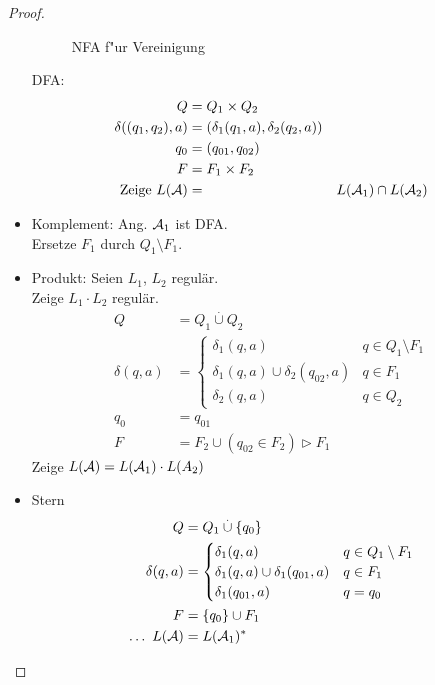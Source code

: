 \begin{proof}
\begin{itemize}
\begin{figure}[tp]
            \caption{\acs{NFA} f"ur Vereinigung}
            \label{fig:reg-closure-union}
        \end{figure}
		DFA:
		\begin{align*}
			Q &= Q_1\times Q_2\\
			\delta((q_1,q_2),a) &= (\delta_1(q_1,a),\delta_2(q_2,a))\\
			q_0 &= (q_{01},q_{02})\\
			F &= F_1\times F_2\\
			\text{Zeige }L(\mathcal{A}) &= &L(\mathcal{A}_1)\cap L(\mathcal{A}_2)
		\end{align*}
	\item Komplement: Ang. $\mathcal{A}_1$ ist \ac{DFA}.\\
		Ersetze $F_1$ durch $Q_1\setminus F_1$.
%
%
	\item Produkt: Seien $L_1$, $L_2$ regulär.\\
		Zeige $L_1\cdot L_2$ regulär.
		\begin{align*}
			Q &= Q_1 \overset.\cup Q_2\\
			\delta(q,a) &=
				\begin{cases}
					\delta_1(q,a) & q\in Q_1\setminus F_1\\
					\delta_1(q,a)\cup\delta_2(q_{02},a) & q\in F_1\\
					\delta_2(q,a) & q\in Q_2
				\end{cases}\\
		q_0& = q_{01}\\
		F &= F_2\cup(q_{02}\in F_2) \rhd F_1
		\end{align*}
		Zeige $L(\mathcal{A}) = L(\mathcal{A}_1)\cdot L(A_2)$
	\item Stern
	\begin{align*}
		Q &= Q_1\overset.\cup \{q_0\}\\
		\delta(q,a) &=
			\begin{cases}
				\delta_1(q,a) & q\in Q_1\setminus F_1\\
				\delta_1(q,a)\cup\delta_1(q_{01},a) & q\in F_1\\
				\delta_1(q_{01},a) & q=q_0
			\end{cases}\\
		F &= \{q_0\}\cup F_1\\
		\dots\ L(\mathcal{A}) &= L(\mathcal{A}_1)^*
	\end{align*}
	\end{itemize}
\end{proof}
%
